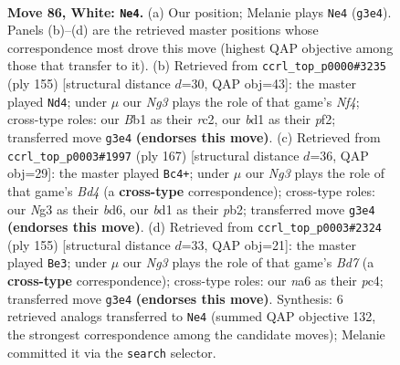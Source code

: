 \documentclass[11pt]{article}
\begin{document}
\clearpage

\begin{figure}[p]\centering
\begin{subfigure}{0.46\textwidth}\centering
\resizebox{\linewidth}{!}{%
\newchessgame
\chessboard[
  setfen={5r2/5p2/n5p1/1k2P2p/5Pp1/6N1/7P/1B1b2K1 w - - 30 86},
  showmover=false,
  pgfstyle=straightmove, color=movearrow, markmove={g3-e4}
]}
\caption{}
\end{subfigure}\hfill
\begin{subfigure}{0.46\textwidth}\centering
\resizebox{\linewidth}{!}{%
\newchessgame
\chessboard[
  setfen={5k2/5p2/6pp/2p2n2/7P/1P4P1/2R2PBK/3r4 b - - 1 78},
  showmover=false,
  pgfstyle=straightmove, color=movearrow, markmove={f5-d4}
]}
\caption{}
\end{subfigure}
\\[4pt]
\begin{subfigure}{0.46\textwidth}\centering
\resizebox{\linewidth}{!}{%
\newchessgame
\chessboard[
  setfen={8/8/3B4/1p1b2k1/1P3p1p/5P1P/1P4P1/5K2 b - - 39 84},
  showmover=false,
  pgfstyle=straightmove, color=movearrow, markmove={d5-c4}
]}
\caption{}
\end{subfigure}\hfill
\begin{subfigure}{0.46\textwidth}\centering
\resizebox{\linewidth}{!}{%
\newchessgame
\chessboard[
  setfen={8/1B6/1p2k2p/6p1/1PP3P1/1K3P1P/3b4/8 b - - 0 78},
  showmover=false,
  pgfstyle=straightmove, color=movearrow, markmove={d2-e3}
]}
\caption{}
\end{subfigure}
\caption{\textbf{Move 86, White: \texttt{Ne4}.} (a) Our position; Melanie plays \texttt{Ne4} (\texttt{g3e4}). Panels (b)--(d) are the retrieved master positions whose correspondence most drove this move (highest QAP objective among those that transfer to it). (b) Retrieved from \texttt{ccrl\_top\_p0000\#3235} (ply 155) [structural distance $d$=30, QAP obj=43]: the master played \texttt{Nd4}; under $\mu$ our \emph{Ng3} plays the role of that game's \emph{Nf4}; cross-type roles: our \emph{B}b1 as their \emph{r}c2, our \emph{b}d1 as their \emph{p}f2; transferred move \texttt{g3e4} \textbf{(endorses this move)}. (c) Retrieved from \texttt{ccrl\_top\_p0003\#1997} (ply 167) [structural distance $d$=36, QAP obj=29]: the master played \texttt{Bc4+}; under $\mu$ our \emph{Ng3} plays the role of that game's \emph{Bd4} (a \textbf{cross-type} correspondence); cross-type roles: our \emph{N}g3 as their \emph{b}d6, our \emph{b}d1 as their \emph{p}b2; transferred move \texttt{g3e4} \textbf{(endorses this move)}. (d) Retrieved from \texttt{ccrl\_top\_p0003\#2324} (ply 155) [structural distance $d$=33, QAP obj=21]: the master played \texttt{Be3}; under $\mu$ our \emph{Ng3} plays the role of that game's \emph{Bd7} (a \textbf{cross-type} correspondence); cross-type roles: our \emph{n}a6 as their \emph{p}c4; transferred move \texttt{g3e4} \textbf{(endorses this move)}. Synthesis: 6 retrieved analogs transferred to \texttt{Ne4} (summed QAP objective 132, the strongest correspondence among the candidate moves); Melanie committed it via the \texttt{search} selector.}
\label{fig:thought-m170}
\end{figure}
\end{document}
